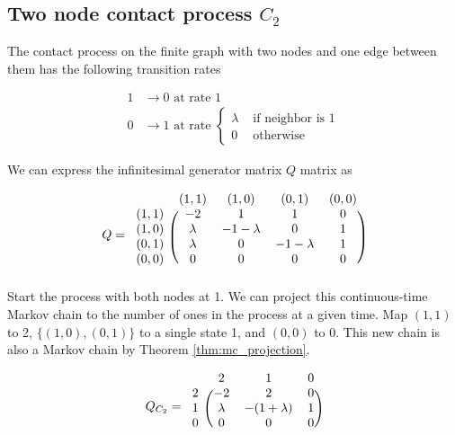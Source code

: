\documentclass{article}
\theoremstyle{plain}
\theoremstyle{definition}
\theoremstyle{remark}
\numberwithin{equation}{section}
\begin{document}
\subsection{Two node contact process \texorpdfstring{$C_2$}{C2}}

The contact process on the finite graph with two nodes and one edge between them has the following transition rates

\begin{align}
    1 &\to 0 \text{ at rate } 1\\
    0 &\to 1 \text{ at rate } \begin{cases}
        \lambda & \text{ if neighbor is 1}\\
        0 & \text{ otherwise}
    \end{cases}
\end{align}

We can express the infinitesimal generator matrix $Q$ matrix as

$$
Q = \begin{blockarray}{ccccc}
    & (1,1) & (1,0) & (0,1) & (0,0)\\
    \begin{block}{c(cccc)}
        (1,1) & -2 & 1 & 1 & 0\\
        (1,0) & \lambda & - 1 - \lambda & 0 & 1\\
        (0,1) & \lambda & 0 & - 1 - \lambda & 1\\
        (0,0) & 0 & 0 & 0 & 0\\
    \end{block}
\end{blockarray}
$$
Start the process with both nodes at 1.
We can project this continuous-time Markov chain to the number of ones in the process at a given time.
Map $(1,1)$ to 2, $\{(1,0),(0,1)\}$ to a single state 1, and $(0,0)$ to 0.
This new chain is also a Markov chain by Theorem \ref{thm:mc_projection}.

\begin{equation}\label{eq:q_c_2}
Q_{C_2} = \begin{blockarray}{cccc}
    & 2 & 1 & 0\\
    \begin{block}{c(ccc)}
        2 & -2 & 2 & 0\\
        1 & \lambda & - (1 + \lambda) & 1\\
        0 & 0 & 0 & 0\\
    \end{block}
\end{blockarray}
\end{equation}
\end{document}
